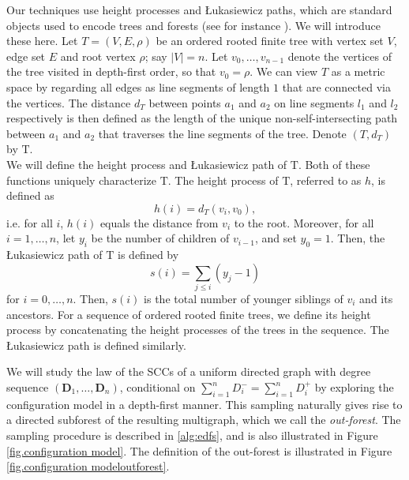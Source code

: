 Our techniques use height processes and \L ukasiewicz paths, which are standard objects used to encode trees and forests (see for instance \cite[Chapter 0]{AST_2002__281__R1_0}). We will introduce these here. Let $T=(V,E,\rho)$ be an ordered rooted finite tree with vertex set $V$, edge set $E$ and root vertex $\rho$; say $|V|=n$. Let $v_0,\dots,v_{n-1}$ denote the vertices of the tree visited in depth-first order, so that $v_0=\rho$. We can view $T$ as a metric space by regarding all edges as line segments of length $1$ that are connected via the vertices. The distance $d_T$ between points $a_1$ and $a_2$ on line segments $l_1$ and $l_2$ respectively is then defined as the length of the unique non-self-intersecting path between $a_1$ and $a_2$ that traverses the line segments of the tree. Denote $(T,d_T)$ by $\mathrm{T}$.\\
We will define the height process and \L ukasiewicz path of $\mathrm{T}$. Both of these functions uniquely characterize $\mathrm{T}$. The height process of $\mathrm{T}$, referred to as $h$, is defined as $$h(i)=d_T(v_i,v_0),$$ i.e.  for all $i$, $h(i)$ equals the distance from $v_i$ to the root.
Moreover, for all $i=1,\dots,n$, let $y_i$ be the number of children of $v_{i-1}$, and set $y_0=1$. Then, the \L ukasiewicz path of $\mathrm{T}$ is defined by $$s(i)=\sum\limits_{j\leq i} (y_j-1)$$ for $i=0,\dots,n$. Then, $s(i)$ is the total number of younger siblings of $v_i$ and its ancestors.
For a sequence of ordered rooted finite trees, we define its height process by concatenating the height processes of the trees in the sequence. The \L ukasiewicz path is defined similarly. 

We will study the law of the SCCs of a uniform directed graph with degree sequence $(\mathbf{D}_1,\dots,\mathbf{D}_n)$, conditional on $\sum_{i=1}^n D^-_i=\sum_{i=1}^n D^+_i$ by exploring the configuration model in a depth-first manner. This sampling naturally gives rise to a directed subforest of the resulting multigraph, which we call the \emph{out-forest}. The sampling procedure is  described in \cref{alg:edfs}, and is also illustrated in Figure \ref{fig.configuration model}. The definition of the out-forest is illustrated in Figure \ref{fig.configuration modeloutforest}.  

